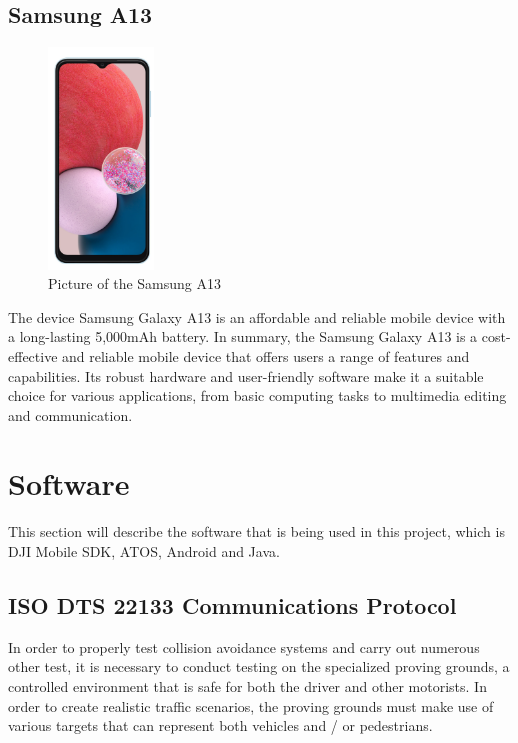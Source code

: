 \subsection{Samsung A13} \label{Samsung}
\begin{figure}[h!]
\centering
 \includegraphics[width=0.25\textwidth,angle =90]{figure/Samsung_A13.png}
\caption{Picture of the Samsung A13}
\end{figure}
The device Samsung Galaxy A13 is an affordable and reliable mobile device with a long-lasting 5,000mAh battery.
In summary, the Samsung Galaxy A13 is a cost-effective and reliable mobile device that offers users a range of features and capabilities. Its robust hardware and user-friendly software make it a suitable choice for various applications, from basic computing tasks to multimedia editing and communication.



\section{Software} \label{Software}
This section will describe the software that is being used in this project, which is DJI Mobile SDK, ATOS, Android and Java.


\subsection{ISO DTS 22133 Communications Protocol} \label{ISO}
In order to properly test collision avoidance systems and carry out numerous other test, it is necessary to conduct testing on the specialized proving grounds, a controlled environment that is safe for both the driver and other motorists. In order to create realistic traffic scenarios, the proving grounds must make use of various targets that can represent both vehicles and / or pedestrians.

